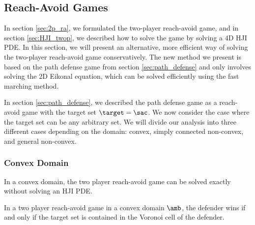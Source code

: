\subsection{Reach-Avoid Games}
\label{sec:reach_avoid}
In section \ref{sec:2p_ra}, we formulated the two-player reach-avoid game, and in section \ref{sec:HJI_twop}, we described how to solve the game by solving a 4D HJI PDE. In this section, we will present an alternative, more efficient way of solving the two-player reach-avoid game conservatively. The new method we present is based on the path defense game from section \ref{sec:path_defense} and only involves solving the 2D Eikonal equation, which can be solved efficiently using the fast marching method.

In section \ref{sec:path_defense}, we described the path defense game as a reach-avoid game with the target set $\target=\sac$. We now consider the case where the target set can be any arbitrary set. We will divide our analysis into three different cases depending on the domain: convex, simply connected non-convex, and general non-convex.

\subsubsection{Convex Domain}
In a convex domain, the two player reach-avoid game can be solved exactly without solving an HJI PDE.

\begin{lem} \label{lem:cvx_domain}
In a two player reach-avoid game in a convex domain $\amb$, the defender wins if and only if the target set is contained in the Voronoi cell of the defender.
\end{lem}

